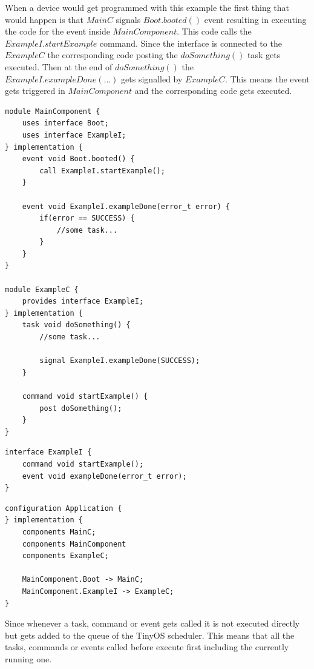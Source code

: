 When a device would get programmed with this example the first thing that would happen is that $MainC$ signals $Boot.booted()$ event resulting in executing the code for the event inside $MainComponent$. This code calls the $ExampleI.startExample$ command. Since the interface is connected to the $ExampleC$ the corresponding code posting the $doSomething()$ task gets executed. Then at the end of $doSomething()$ the $ExampleI.exampleDone(...)$ gets signalled by $ExampleC$. This means the event gets triggered in $MainComponent$ and the corresponding code gets executed. \cite{Tinyos} \cite{TinyosT}     

\begin{lstlisting}
module MainComponent {
	uses interface Boot;
	uses interface ExampleI;
} implementation {
	event void Boot.booted() {
		call ExampleI.startExample();
	}
	
	event void ExampleI.exampleDone(error_t error) {
		if(error == SUCCESS) {
			//some task...
		}
	}
}

module ExampleC {
	provides interface ExampleI;
} implementation {
	task void doSomething() {
		//some task...
		
		signal ExampleI.exampleDone(SUCCESS);
	}
	
	command void startExample() {
		post doSomething();
	}
}
\end{lstlisting}


\begin{lstlisting}
interface ExampleI {
	command void startExample();
	event void exampleDone(error_t error);
}
\end{lstlisting}

\begin{lstlisting}
configuration Application {
} implementation {
	components MainC;
	components MainComponent
	components ExampleC;
		
	MainComponent.Boot -> MainC;
	MainComponent.ExampleI -> ExampleC;
}
\end{lstlisting} 

Since whenever a task, command or event gets called it is not executed directly but gets added to the queue of the TinyOS scheduler. This means that all the tasks, commands or events called before execute first including the currently running one. 